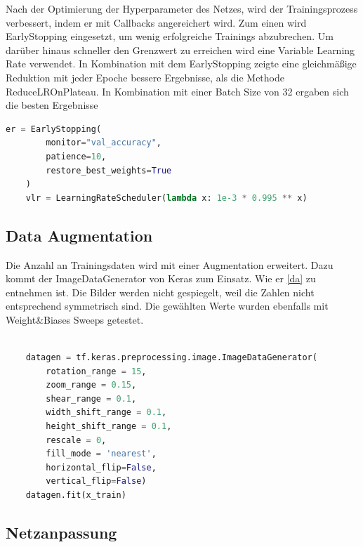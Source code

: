 \documentclass[
fontsize=12pt,					%
paper=a4,						%
twoside=false, 					%
listof=totoc, 					%
bibliography=totoc,				%
titlepage, 						%
headsepline, 					%
DIV=12,							%
BCOR=6mm,						%
cleardoublepage=empty,			%
parskip,							%
ngerman
]{scrartcl}
\begin{document}
Nach der Optimierung der Hyperparameter des Netzes, wird der Trainingsprozess verbessert, indem er mit Callbacks angereichert wird. Zum einen wird EarlyStopping eingesetzt, um wenig erfolgreiche Trainings abzubrechen. Um darüber hinaus schneller den Grenzwert zu erreichen wird eine Variable Learning Rate verwendet. In Kombination mit dem EarlyStopping zeigte eine gleichmäßige Reduktion mit jeder Epoche bessere Ergebnisse, als die Methode ReduceLROnPlateau. In Kombination mit einer Batch Size von 32 ergaben sich die besten Ergebnisse

\begin{lstlisting}[language=Python, caption=Callbacks, label=callback]
	er = EarlyStopping(
		monitor="val_accuracy",
		patience=10,
	    restore_best_weights=True
	)
	vlr = LearningRateScheduler(lambda x: 1e-3 * 0.995 ** x)
\end{lstlisting}

\subsection{Data Augmentation}

Die Anzahl an Trainingsdaten wird mit einer Augmentation erweitert. Dazu kommt der ImageDataGenerator von Keras zum Einsatz. Wie er \autoref{da} zu entnehmen ist. Die Bilder werden nicht gespiegelt, weil die Zahlen nicht entsprechend symmetrisch sind. Die gewählten Werte wurden ebenfalls mit Weight\&Biases Sweeps getestet.

\begin{lstlisting}[language=Python, caption=Data Augmentation, label=da]
	
	datagen = tf.keras.preprocessing.image.ImageDataGenerator(
		rotation_range = 15,
		zoom_range = 0.15,
		shear_range = 0.1,
		width_shift_range = 0.1,
		height_shift_range = 0.1,
		rescale = 0,
		fill_mode = 'nearest',
		horizontal_flip=False,
		vertical_flip=False)
	datagen.fit(x_train)

\end{lstlisting}

\subsection{Netzanpassung}
\end{document}
